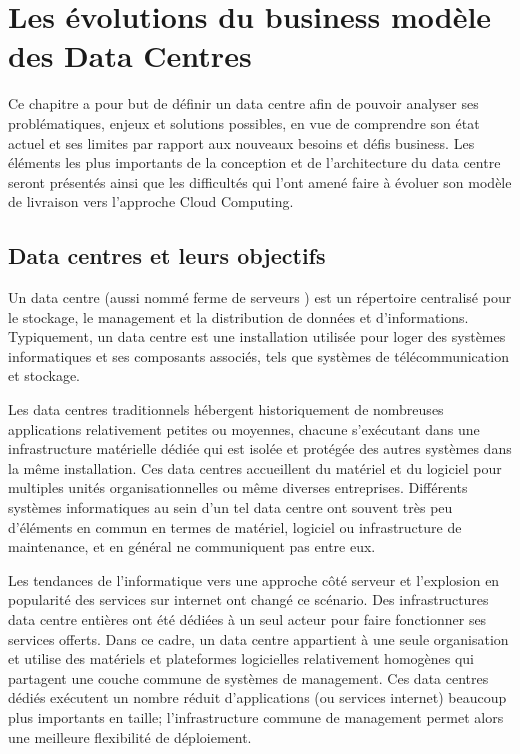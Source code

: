 
\chapter{Les évolutions du business modèle des Data Centres}
\label{chap-1}

Ce chapitre a pour but de définir un data centre afin de pouvoir analyser ses problématiques, enjeux et solutions possibles, en vue de comprendre son état actuel et ses limites par rapport aux nouveaux besoins et défis business. Les éléments les plus importants de la conception et de l'architecture du data centre seront présentés ainsi que les difficultés qui l'ont amené faire à évoluer son modèle de livraison vers l'approche Cloud Computing.

\section{Data centres et leurs objectifs}

Un data centre (aussi nommé \og ferme de serveurs \fg{}) est un répertoire centralisé pour le stockage, le management et la distribution de données et d'informations. Typiquement, un data centre est une installation utilisée pour loger des systèmes informatiques et ses composants associés, tels que systèmes de télécommunication et stockage. 

Les data centres traditionnels hébergent historiquement de nombreuses applications relativement petites ou moyennes, chacune s'exécutant dans une infrastructure matérielle dédiée qui est isolée et protégée des autres systèmes dans la même installation. Ces data centres accueillent du matériel et du logiciel pour multiples unités organisationnelles ou même diverses entreprises. Différents systèmes informatiques au sein d'un tel data centre ont souvent très peu d'éléments en commun en termes de matériel, logiciel ou infrastructure de maintenance, et en général ne communiquent pas entre eux. 


Les tendances de l'informatique vers une approche côté serveur et l'explosion en popularité des services sur internet ont changé ce scénario. Des infrastructures data centre entières ont été dédiées à un seul acteur pour faire fonctionner ses services offerts. Dans ce cadre, un data centre appartient à une seule organisation et utilise des matériels et plateformes logicielles relativement homogènes qui partagent une couche commune de systèmes de management. Ces data centres dédiés exécutent un nombre réduit d'applications (ou services internet) beaucoup plus importants en taille; l'infrastructure commune de management permet alors une meilleure flexibilité de déploiement. 

